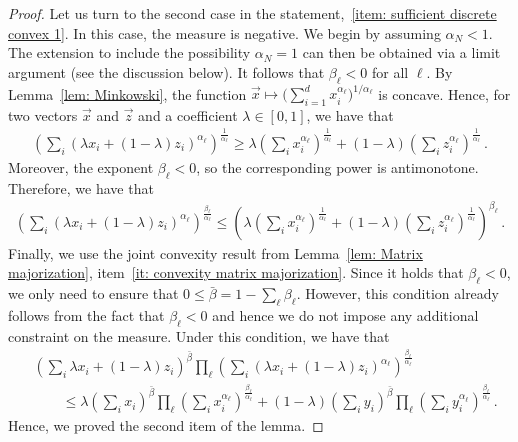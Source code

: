 \documentclass[aps,pra,11pt,onecolumn,nofootinbib,tightenlines]{revtex4-2}
\theoremstyle{definition}
\begin{document}
\begin{proof}
 Let us turn to the second case in the statement,~\ref{item: sufficient discrete convex 1}. In this case, the measure is negative. We begin by assuming $\alpha_N<1$. The extension to include the possibility $\alpha_N=1$ can then be obtained via a limit argument (see the discussion below). It follows that $\beta_\ell < 0$ for all $\ell$. By Lemma~\ref{lem: Minkowski}, the function $\vec{x} \mapsto \big(\sum_{i=1}^d x_i^{\alpha_\ell}\big)^{1/\alpha_\ell}$ is concave. Hence, for two vectors $\vec{x}$ and $\vec{z}$ and a coefficient $\lambda \in [0,1]$, we have that
\begin{align}
    \left(\sum_{i} (\lambda x_i+(1-\lambda)z_i)^{\alpha_\ell}\right)^\frac{1}{\alpha_\ell} \geq \lambda \left(\sum_{i} x_i^{\alpha_\ell}\right)^\frac{1}{\alpha_\ell} + (1-\lambda) \left(\sum_{i}  z_i^{\alpha_\ell}\right)^\frac{1}{\alpha_\ell} \,.
\end{align}
Moreover, the exponent $\beta_\ell < 0$, so the corresponding power is antimonotone. Therefore, we have that
\begin{align}
    \left(\sum_{i} (\lambda x_i+(1-\lambda)z_i)^{\alpha_\ell}\right)^{\frac{\beta_\ell}{\alpha_\ell}} \leq \left(\lambda \left(\sum_{i} x_i^{\alpha_\ell}\right)^\frac{1}{\alpha_\ell} + (1-\lambda) \left(\sum_{i}  z_i^{\alpha_\ell}\right)^\frac{1}{\alpha_\ell}\right)^{\beta_\ell} \,.
\end{align}
Finally, we use the joint convexity result from Lemma~\ref{lem: Matrix majorization}, item~\ref{it: convexity matrix majorization}. Since it holds that $\beta_\ell <0$, we only need to ensure that $0 \leq \bar{\beta}= 1- \sum_\ell\beta_\ell $. However, this condition already follows from the fact that $\beta_\ell<0$ and hence we do not impose any additional constraint on the measure.  Under this condition, we have that
\begin{align}
    &\left(\sum_{i} \lambda x_i+(1-\lambda )z_i \right)^{\bar{\beta}} \prod_{\ell} \left(\sum_{i} (\lambda x_i+(1-\lambda ) z_i)^{\alpha_\ell} \right)^{\frac{\beta_\ell}{\alpha_\ell}} \\
    &\qquad \leq \lambda \left(\sum_{i} x_i \right)^{\bar{\beta}} \prod_{\ell} \left(\sum_{i} x_i^{\alpha_\ell} \right)^{\frac{\beta_\ell}{\alpha_\ell}} + (1-\lambda) \left(\sum_{i} y_i \right)^{\bar{\beta}} \prod_{\ell} \left(\sum_{i} y_i^{\alpha_\ell} \right)^{\frac{\beta_\ell}{\alpha_\ell}} \,.
\end{align}
Hence, we proved the second item of the lemma.

\bigskip


\end{proof}
\end{document}
